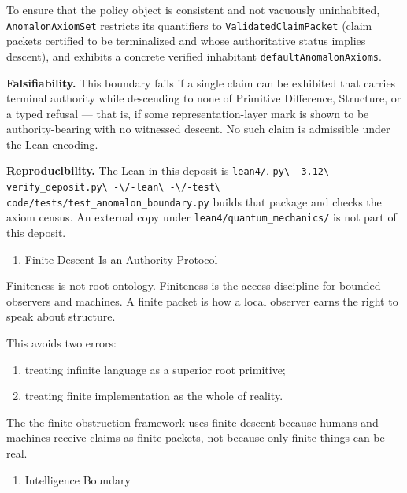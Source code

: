 \documentclass[
  10pt,
]{article}
\providecommand{\tightlist}{%
  \setlength{\itemsep}{0pt}\setlength{\parskip}{0pt}}
\providecommand{\tightlist}{%
  \setlength{\itemsep}{0pt}\setlength{\parskip}{0pt}}
\DeclareRobustCommand{\texttt}[1]{{\paperSymbolFont\nolinkurl{#1}}}
\begin{document}
To ensure that the policy object is consistent and not vacuously uninhabited, \texttt{AnomalonAxiomSet} restricts its quantifiers to \texttt{ValidatedClaimPacket} (claim packets certified to be terminalized and whose authoritative status implies descent), and exhibits a concrete verified inhabitant \texttt{defaultAnomalonAxioms}.

\textbf{Falsifiability.} This boundary fails if a single claim can be exhibited that carries terminal authority while descending to none of Primitive Difference, Structure, or a typed refusal --- that is, if some representation-layer mark is shown to be authority-bearing with no witnessed descent. No such claim is admissible under the Lean encoding.

\textbf{Reproducibility.} The Lean in this deposit is \texttt{lean4/}. \texttt{py\ -3.12\ verify\_deposit.py\ -\/-lean\ -\/-test\ code/tests/test\_anomalon\_boundary.py} builds that package and checks the axiom census. An external copy under \texttt{lean4/quantum\_mechanics/} is not part of this deposit.

\begin{enumerate}
\def\labelenumi{\arabic{enumi}.}
\setcounter{enumi}{6}
\tightlist
\item
  Finite Descent Is an Authority Protocol
\end{enumerate}

Finiteness is not root ontology. Finiteness is the access discipline for bounded observers and machines. A finite packet is how a local observer earns the right to speak about structure.

This avoids two errors:

\begin{enumerate}
\def\labelenumi{\arabic{enumi}.}
\tightlist
\item
  treating infinite language as a superior root primitive;
\item
  treating finite implementation as the whole of reality.
\end{enumerate}

The the finite obstruction framework uses finite descent because humans and machines receive claims as finite packets, not because only finite things can be real.

\begin{enumerate}
\def\labelenumi{\arabic{enumi}.}
\setcounter{enumi}{7}
\tightlist
\item
  Intelligence Boundary
\end{enumerate}
\end{document}
